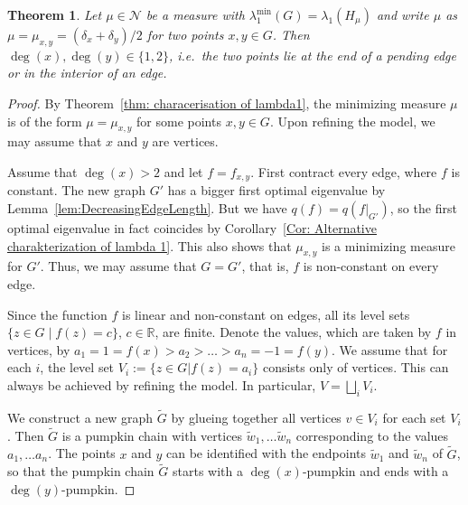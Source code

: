 \documentclass[reqno]{amsart}
\theoremstyle{plain}
\newtheorem{thm}{Theorem}[section]
\theoremstyle{definition}
\theoremstyle{remark}
\numberwithin{equation}{section}
\newcommand{\R}{\mathbb{R}}     %
\newcommand{\cN}{\mathcal{N}}
\begin{document}
\begin{thm}\label{thm: points avoid vertices}
	Let $\mu \in \cN$ be a measure with $\lambda_{1}^{\min}(G)=\lambda_1(H_{\mu})$ and write $\mu$ as $\mu = \mu_{x,y} = (\delta_x + \delta_y)/2$ for two points $x, y \in G$. Then $\deg(x), \deg(y) \in \{1,2\}$, i.e.~the two points lie at the end of a pending edge or in the interior of an edge.  
\end{thm}


\begin{proof}
	By Theorem~\ref{thm: characerisation of lambda1}, the minimizing measure $\mu$ is of the form $\mu = \mu_{x,y}$ for some points $x, y\in G$. Upon refining the model, we may assume that $x$ and $y$ are vertices.
	
	
	Assume that $\deg(x) > 2$ and let $f=f_{x,y}$. First contract every edge, where $f$ is constant. The new graph $G'$ has a bigger first optimal eigenvalue by Lemma~\ref{lem:DecreasingEdgeLength}. But we have $q(f) = q(f|_{G'})$, so the first optimal eigenvalue in fact coincides by Corollary~\ref{Cor: Alternative charakterization of lambda 1}. This also shows that $\mu_{x,y}$ is a minimizing measure for $G'$. Thus, we may assume that $G=G'$, that is, $f$ is non-constant on every edge.
	
	Since the function $f$ is linear and non-constant on edges, all its level sets $\{z \in G\; | \; f(z)=c\}$, $ c \in \R$, are finite. Denote the values, which are taken by $f$ in vertices, by $a_1 = 1 = f(x) > a_2 > \dots > a_n = -1 = f(y)$. We assume that for each $i$, the level set $V_i := \{z \in G | f(z) = a_i\}$ consists only of vertices. This can always be achieved by refining the model. In particular, $V = \bigsqcup_i V_i$.
	

	
	We construct a new graph $\widetilde G$ by glueing together all vertices $v \in V_i$ for each set $V_i$. Then $\widetilde G$ is a pumpkin chain with vertices $\widetilde w_1, \dots \widetilde w_n$ corresponding to the values $a_1, \dots a_n$. The points $x$ and $y$ can be identified with the endpoints $\widetilde w_1$ and $\widetilde w_n$ of $\widetilde G$, so that the pumpkin chain $\widetilde G$ starts with a $\deg(x)$-pumpkin and ends with a $\deg(y)$-pumpkin.
	
	
	

\end{proof}
\end{document}

